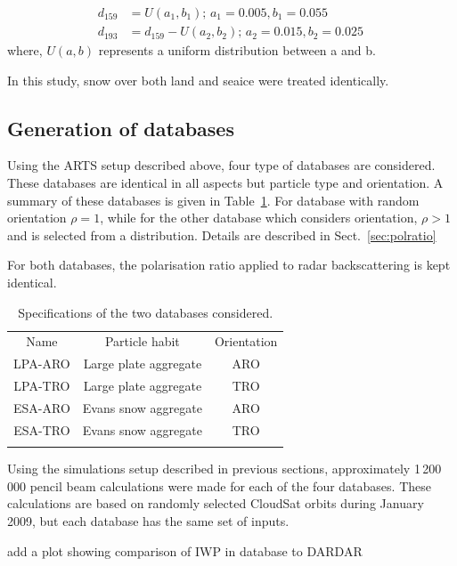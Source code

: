 \documentclass[amt, manuscript]{copernicus}
\newcommand{\todo}[1]{{\color{red} #1}}
\begin{document}
\begin{align}
d_{159}& = U(a_1, b_1) ;\, a_1 = 0.005, b_1 = 0.055\\
d_{193}& = d_{159} - U(a_2, b_2) ;\, a_2 = 0.015, b_2 = 0.025 \,
\end{align}
where, $U(a, b)$ represents a uniform distribution between a and b. 

In this study, snow over both land and seaice were treated identically.  

\subsection{Generation of databases}
\label{sec:database}

Using the ARTS setup described above, four type of databases are considered. These databases are identical in all aspects but particle type and orientation. A summary of these databases is given in Table~\ref{tab:database_configuration}.  For database with random orientation $\rho = 1$, while for the other  database which considers orientation, $\rho> 1$ and is selected from a distribution. Details are described in Sect.~\ref{sec:polratio}

For both databases, the polarisation ratio applied to radar backscattering is kept identical.
 
\begin{table}[t]
	\caption{Specifications of the two databases considered.}
	\label{tab:database_configuration}	
	\begin{tabular}{ccc}
		\tophline
		Name & Particle habit 	& Orientation  \\
		\middlehline
		LPA-ARO & Large plate aggregate & ARO\\
		LPA-TRO & Large plate aggregate & TRO\\
		ESA-ARO & Evans snow aggregate & ARO\\
		ESA-TRO & Evans snow  aggregate & TRO\\
		\bottomhline
	\end{tabular}
	\belowtable{} %
\end{table}

Using the simulations setup described in previous sections, approximately 1\,200\,000 pencil beam calculations were made for each of the four databases. These calculations are based on randomly selected CloudSat orbits during January 2009, but each database has the same set of inputs.

\todo{add a plot showing comparison of IWP in database to DARDAR}
\end{document}
